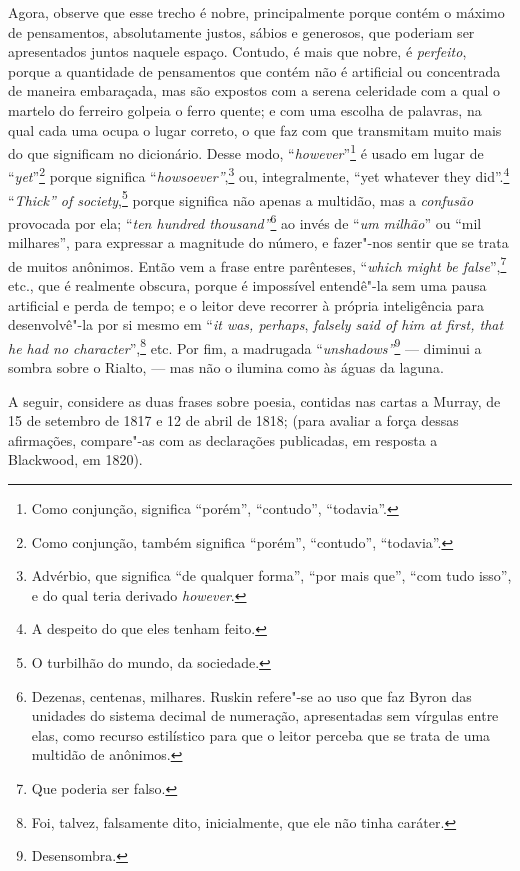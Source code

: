 Agora, observe que esse trecho é nobre, principalmente porque
contém o máximo de pensamentos, absolutamente justos, sábios e
generosos, que poderiam ser apresentados juntos naquele espaço. Contudo,
é mais que nobre, é \textit{perfeito}, porque a quantidade de pensamentos
que contém não é artificial ou concentrada de maneira embaraçada, mas
são expostos com a serena celeridade com a qual o martelo do ferreiro
golpeia o ferro quente; e com uma escolha de palavras, na qual cada uma
ocupa o lugar correto, o que faz com que transmitam muito mais do que
significam no dicionário. Desse modo, ``\textit{however}''\footnote{Como
  conjunção, significa ``porém'', ``contudo'', ``todavia''.} é usado em lugar de ``\textit{yet}''\footnote{Como conjunção,
  também significa ``porém'', ``contudo'', ``todavia''.}
porque significa ``\textit{howsoever''},\footnote{Advérbio, que significa
  ``de qualquer forma'', ``por mais que'', ``com tudo isso'', e do qual
  teria derivado \textit{however}.} ou, integralmente,
``yet whatever they did''.\footnote{A despeito do que eles tenham feito.} ``\textit{Thick'' of society},\footnote{O turbilhão do
  mundo, da sociedade.} porque significa não apenas a
multidão, mas a \textit{confusão} provocada por ela; ``\textit{ten hundred
thousand''}\footnote{Dezenas, centenas, milhares. Ruskin refere"-se ao
  uso que faz Byron das unidades do sistema decimal de numeração,
  apresentadas sem vírgulas entre elas, como recurso estilístico para
  que o leitor perceba que se trata de uma multidão de anônimos.} ao invés de ``\textit{um milhão}'' ou ``mil milhares'', para
expressar a magnitude do número, e fazer"-nos sentir que se trata de
muitos anônimos. Então vem a frase entre parênteses, ``\textit{which might
be false}'',\footnote{Que poderia ser falso.} etc.,
que é realmente obscura, porque é impossível entendê"-la sem uma pausa
artificial e perda de tempo; e o leitor deve recorrer à própria
inteligência para desenvolvê"-la por si mesmo em ``\textit{it was,
perhaps}, \textit{falsely said of him at first, that he had no
character}'',\footnote{Foi, talvez, falsamente dito, inicialmente, que
  ele não tinha caráter.} etc. Por fim, a madrugada
``\textit{unshadows''}\footnote{Desensombra.} --- diminui a
sombra sobre o Rialto, --- mas não o ilumina como às águas da laguna.

A seguir, considere as duas frases sobre poesia, contidas nas
cartas a Murray, de 15 de setembro de 1817 e 12 de abril de 1818; (para
avaliar a força dessas afirmações, compare"-as com as declarações
publicadas, em resposta a Blackwood, em 1820).

